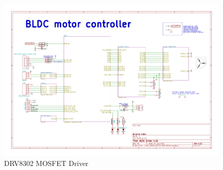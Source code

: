 \begin{figure}
    \includegraphics[width=\textwidth,page=7]{Images/BLDC_4}
    \caption{DRV8302 MOSFET Driver}
    \label{fig:sch7}
\end{figure}

